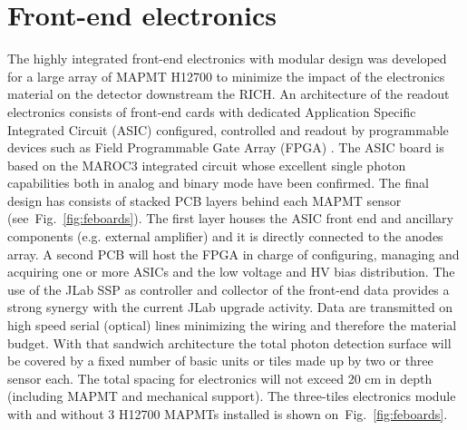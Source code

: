 \section{Front-end electronics$^{}$}

The highly integrated front-end electronics with modular design was developed for a large array of MAPMT H12700 to minimize the impact of the electronics material on the detector downstream the RICH.
An architecture of the readout electronics consists of front-end cards with dedicated Application Specific Integrated Circuit (ASIC) configured, controlled and readout by programmable devices such as Field Programmable Gate Array (FPGA) \cite{RICH_FE}.
The ASIC board is based on the MAROC3  integrated circuit \cite{MAROC} whose excellent single photon capabilities both in analog and binary mode have been confirmed.
The final design has consists of stacked PCB layers behind each MAPMT sensor (see~Fig.~\ref{fig:feboards}).
The first layer houses the ASIC front end and ancillary components (e.g. external amplifier) and it is directly connected to the anodes array.
A second PCB will host the FPGA in charge of configuring, managing and acquiring one or more ASICs and the low voltage and HV bias distribution.
The use of the JLab SSP as controller and collector of the front-end data provides a strong synergy with the current JLab upgrade activity.
Data are transmitted on high speed serial (optical) lines minimizing the wiring and therefore the material budget.
With that sandwich architecture the total photon detection surface will be covered by a fixed number of basic units or tiles made up by two or three sensor each.
The total spacing for electronics will not exceed 20 cm in depth (including MAPMT and mechanical support).
The three-tiles electronics module with and without 3 H12700 MAPMTs installed is shown on~Fig.~\ref{fig:feboards}.

